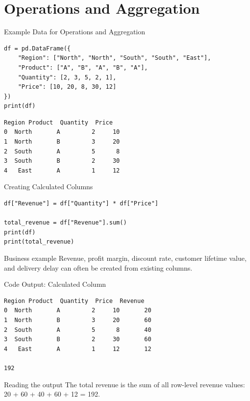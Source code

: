 \documentclass[aspectratio=169,11pt]{beamer}
\begin{document}
\section{Operations and Aggregation}

\begin{frame}[fragile]{Example Data for Operations and Aggregation}
\small
\begin{lstlisting}[style=py]
df = pd.DataFrame({
    "Region": ["North", "North", "South", "South", "East"],
    "Product": ["A", "B", "A", "B", "A"],
    "Quantity": [2, 3, 5, 2, 1],
    "Price": [10, 20, 8, 30, 12]
})
print(df)
\end{lstlisting}
\begin{lstlisting}[style=py]
  Region Product  Quantity  Price
0  North       A         2     10
1  North       B         3     20
2  South       A         5      8
3  South       B         2     30
4   East       A         1     12
\end{lstlisting}
\end{frame}

\begin{frame}[fragile]{Creating Calculated Columns}
\small
\begin{lstlisting}[style=py]
df["Revenue"] = df["Quantity"] * df["Price"]

total_revenue = df["Revenue"].sum()
print(df)
print(total_revenue)
\end{lstlisting}
\begin{block}{Business example}
Revenue, profit margin, discount rate, customer lifetime value, and delivery delay can often be created from existing columns.
\end{block}
\end{frame}

\begin{frame}[fragile]{Code Output: Calculated Column}
\small
\begin{lstlisting}[style=py]
  Region Product  Quantity  Price  Revenue
0  North       A         2     10       20
1  North       B         3     20       60
2  South       A         5      8       40
3  South       B         2     30       60
4   East       A         1     12       12

192
\end{lstlisting}
\begin{block}{Reading the output}
The total revenue is the sum of all row-level revenue values: 20 + 60 + 40 + 60 + 12 = 192.
\end{block}
\end{frame}
\end{document}
